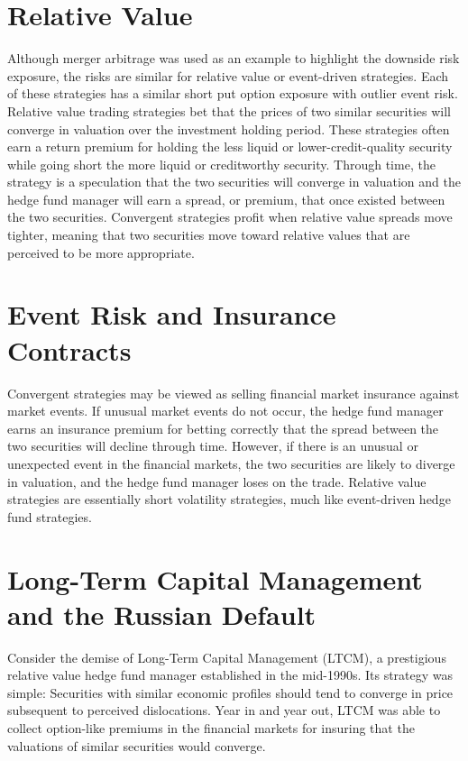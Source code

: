\documentclass[11pt]{article}
\begin{document}
\section*{Relative Value}
Although merger arbitrage was used as an example to highlight the downside risk exposure, the risks are similar for relative value or event-driven strategies. Each of these strategies has a similar short put option exposure with outlier event risk. Relative value trading strategies bet that the prices of two similar securities will converge in valuation over the investment holding period. These strategies often earn a return premium for holding the less liquid or lower-credit-quality security while going short the more liquid or creditworthy security. Through time, the strategy is a speculation that the two securities will converge in valuation and the hedge fund manager will earn a spread, or premium, that once existed between the two securities. Convergent strategies profit when relative value spreads move tighter, meaning that two securities move toward relative values that are perceived to be more appropriate.

\section*{Event Risk and Insurance Contracts}
Convergent strategies may be viewed as selling financial market insurance against market events. If unusual market events do not occur, the hedge fund manager earns an insurance premium for betting correctly that the spread between the two securities will decline through time. However, if there is an unusual or unexpected event in the financial markets, the two securities are likely to diverge in valuation, and the hedge fund manager loses on the trade. Relative value strategies are essentially short volatility strategies, much like event-driven hedge fund strategies.

\section*{Long-Term Capital Management and the Russian Default}
Consider the demise of Long-Term Capital Management (LTCM), a prestigious relative value hedge fund manager established in the mid-1990s. Its strategy was simple: Securities with similar economic profiles should tend to converge in price subsequent to perceived dislocations. Year in and year out, LTCM was able to collect option-like premiums in the financial markets for insuring that the valuations of similar securities would converge.
\end{document}

